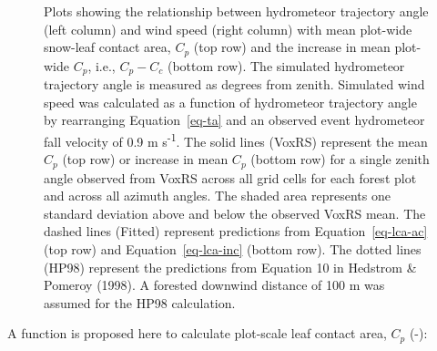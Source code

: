 \documentclass[
  letterpaper,
  DIV=11,
  numbers=noendperiod]{scrartcl}
\begin{document}
\begin{figure}[H]


\caption{\label{fig-lca-ht-ws}Plots showing the relationship between
hydrometeor trajectory angle (left column) and wind speed (right column)
with mean plot-wide snow-leaf contact area, \(C_p\) (top row) and the
increase in mean plot-wide \(C_p\), i.e., \(C_p - C_c\) (bottom row).
The simulated hydrometeor trajectory angle is measured as degrees from
zenith. Simulated wind speed was calculated as a function of hydrometeor
trajectory angle by rearranging Equation~\ref{eq-ta} and an observed
event hydrometeor fall velocity of 0.9 m s\textsuperscript{-1}. The
solid lines (VoxRS) represent the mean \(C_p\) (top row) or increase in
mean \(C_p\) (bottom row) for a single zenith angle observed from VoxRS
across all grid cells for each forest plot and across all azimuth
angles. The shaded area represents one standard deviation above and
below the observed VoxRS mean. The dashed lines (Fitted) represent
predictions from Equation~\ref{eq-lca-ac} (top row) and
Equation~\ref{eq-lca-inc} (bottom row). The dotted lines (HP98)
represent the predictions from Equation 10 in Hedstrom \& Pomeroy
(1998). A forested downwind distance of 100 m was assumed for the HP98
calculation.}

\end{figure}%

A function is proposed here to calculate plot-scale leaf contact area,
\(C_p\) (-):
\end{document}
